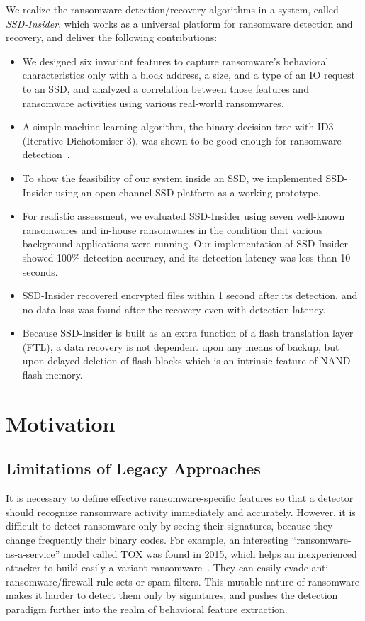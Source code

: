 \documentclass[conference]{IEEEtran}
\newcommand{\ours}{SSD-Insider}
\begin{document}
We realize the ransomware detection/recovery algorithms in a
system, called \textit{SSD-Insider}, which works as a universal
platform for ransomware detection and recovery, and deliver the
following contributions:
\begin{itemize}
\item We designed six invariant features to capture ransomware's
behavioral characteristics only with a block address, a size, and
a type of an IO request to an SSD, and analyzed a correlation
between those features and ransomware activities using various
real-world ransomwares.
\item A simple machine learning algorithm, the binary decision tree
with ID3 (Iterative Dichotomiser 3), was shown to be good enough
for ransomware detection~\cite{quinlan86}.
\item To show the feasibility of our system inside an SSD, we
implemented \ours{} using an open-channel SSD platform as a working
prototype.
\item For realistic assessment, we evaluated \ours{} using seven
well-known ransomwares and in-house ransomwares in the condition
that various background applications were running.  Our
implementation of \ours{} showed 100\% detection accuracy, and its
detection latency was less than 10 seconds. 
\item \ours{} recovered encrypted files within 1 second after its
detection, and no data loss was found after the recovery even with
detection latency.
\item Because \ours{} is built as an extra function of a flash
translation layer (FTL), a data recovery is not dependent upon any
means of backup, but upon delayed deletion of flash blocks which is
an intrinsic feature of NAND flash memory.
\end{itemize}

\section{Motivation}

\subsection{Limitations of Legacy Approaches}

It is necessary to define effective ransomware-specific features so
that a detector should recognize ransomware activity immediately
and accurately.  However, it is difficult to detect ransomware only
by seeing their signatures, because they change frequently their
binary codes.  For example,  an interesting
``ransomware-as-a-service'' model called TOX was found in 2015,
which helps an inexperienced attacker to build easily a variant
ransomware~\cite{walter15}.  They can easily evade
anti-ransomware/firewall rule sets or spam filters.  This mutable
nature of ransomware makes it harder to detect them only by
signatures, and pushes the detection paradigm further into the
realm of behavioral feature extraction.
\end{document}
